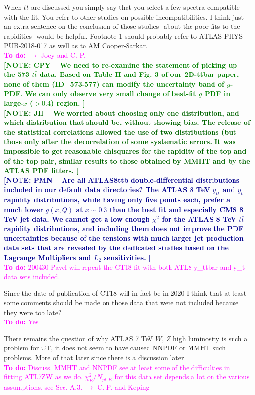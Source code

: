 \documentclass[aps,prd,amsmath,nofootinbib,floatfix,fleqn]{revtex4}
\newcommand{\TODO}[1]{\textcolor{magenta}{
\quad\vspace{3pt} \\ {\bf To do:} #1 \\
}}
\newcommand{\NOTECPY}[1]{\textcolor{green}{ \bf[NOTE: CPY -- #1 ]}}
\newcommand{\NOTEJH}[1]{\textcolor{darkgreen}{ \bf[NOTE: JH -- #1 ]}}
\newcommand{\NOTEPN}[1]{\textcolor{darkblue}{ \bf[NOTE: PMN -- #1 ]}}
\begin{document}
\noindent
When $t\bar t$ are discussed you simply say that you select a few spectra compatible with the fit. You refer to other studies on possible incompatibilities. I think just an extra sentence on the conclusion of those studies- about the poor fits to the rapidities -would be helpful. Footnote 1 should probably refer to ATLAS-PHYS-PUB-2018-017 as well as to AM Cooper-Sarkar. 
\TODO{$\to$ Joey and C.-P.}
\NOTECPY{We need to re-examine the statement of picking up the 573 $t \bar t$ data. Based on Table II and Fig. 3 of our 2D-ttbar paper, none of them (ID=573-577) can modify the uncertainty band of $g$-PDF. We can only observe very small change of best-fit $g$ PDF in large-$x$ ($> 0.4$) region.}\\

\NOTEJH{We worried about choosing only one distribution, and which distribution that should be, without showing bias. The release of the statistical correlations allowed the use of two distributions (but those only after the decorrelation of some systematic errors. It was impossible to get reasonable chisquares for the rapidity of the top and of the top pair, similar results to those obtained by MMHT and by the ATLAS PDF fitters.}\\
\NOTEPN{Are all ATLAS8ttb double-differential distributions included in our default data directories? The ATLAS 8 TeV $y_{t\bar t}$ and $y_{t}$ rapidity distributions, while having  only five points each, prefer a much lower $g(x,Q)$ at $x\sim 0.3$ than the best fit and especially CMS 8 TeV jet data. We cannot get a low enough $\chi^2$ for the ATLAS 8 TeV $t\bar t$ rapidity distributions, and including them does not improve the PDF uncertainties because of the tensions with much larger jet production data sets that are revealed by the dedicated studies based on the Lagrange Multipliers and $L_2$ sensitivities.}
\TODO{200430 Pavel will repeat the CT18 fit with both ATL8 y\_ttbar and y\_t data sets included.}


\noindent
Since the date of publication of CT18 will in fact be in 2020 I think that at least some comments should be made on those data that were not included because they were too late? 
\TODO{Yes}


\noindent
There remains the question of why ATLAS 7 TeV $W$, $Z$ high luminosity is such a problem for CT, it does not seem to have caused NNPDF or MMHT such problems. More of that later since there is a discussion later
\TODO{Discuss. MMHT and NNPDF see at least some of the difficulties in fitting ATL7ZW as we do. $\chi^2_E/N_{pt,E}$ for this data set depends a lot on the various assumptions, see Sec. A.3. $\to$ C.-P. and Keping}
\end{document}
